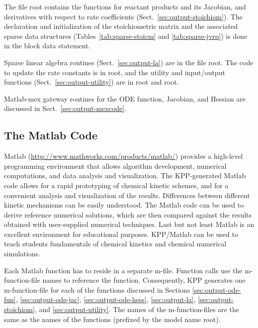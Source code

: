 \documentclass[twoside]{article}
\newcommand{\kpproot}{{\sc root}}
\begin{document}
The file \kpproot{} contains the functions for reactant
products and its Jacobian, and derivatives with respect to rate
coefficients (Sect.~\ref{sec:output-stoichiom}). The declaration and
initialization of the stoichiometric matrix and the associated sparse
data structures (Tables~\ref{tab:sparse-stoicm} and
\ref{tab:sparse-jvrp}) is done in the  block data
statement.

Sparse linear algebra routines (Sect.~\ref{sec:output-la}) are in
the file \kpproot{}. The code to update the rate
constants is in \kpproot{}, and the utility and
input/output functions (Sect.~\ref{sec:output-utility}) are in
\kpproot{} and \kpproot{}.

Matlab-mex gateway routines for the ODE function, Jacobian, and
Hessian are discussed in Sect.~\ref{sec:output-mexcode}.

\subsection{The Matlab Code}
\label{sec:matlab}

Matlab (\url{http://www.mathworks.com/products/matlab/}) provides a
high-level programming environment that allows algorithm development,
numerical computations, and data analysis and visualization. The
KPP-generated Matlab code allows for a rapid prototyping of chemical
kinetic schemes, and for a convenient analysis and visualization of the
results. Differences between different kinetic mechanisms can be easily
understood. The Matlab code can be used to derive reference numerical
solutions, which are then compared against the results obtained with
user-supplied numerical techniques. Last but not least Matlab is an
excellent environment for educational purposes. KPP/Matlab can be used
to teach students fundamentals of chemical kinetics and chemical
numerical simulations.

Each Matlab function has to reside in a separate m-file. Function calls
use the m-function-file names to reference the function. Consequently,
KPP generates one m-function-file for each of the functions discussed in
Sections \ref{sec:output-ode-fun}, \ref{sec:output-ode-jac},
\ref{sec:output-ode-hess}, \ref{sec:output-la},
\ref{sec:output-stoichiom}, and \ref{sec:output-utility}. The names of
the m-function-files are the same as the names of the functions
(prefixed by the model name \kpproot).
\end{document}
